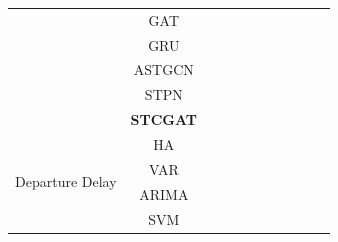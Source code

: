 \documentclass[12pt,a4paper]{report}
\begin{document}
\begin{table}[h]
\begin{tabular}{ccccccccccc}
                                          & GAT             &                              &                            & \multicolumn{1}{c|}{}               &              &               & \multicolumn{1}{c|}{}              &              &               &               \\
                                          & GRU             &                              &                            & \multicolumn{1}{c|}{}               &              &               & \multicolumn{1}{c|}{}              &              &               &               \\
                                          & ASTGCN          &                              &                            & \multicolumn{1}{c|}{}               &              &               & \multicolumn{1}{c|}{}              &              &               &               \\
                                          & STPN            &                              &                            & \multicolumn{1}{c|}{}               &              &               & \multicolumn{1}{c|}{}              &              &               &               \\
                                          & \textbf{STCGAT} &                              &                            & \multicolumn{1}{c|}{}               &              &               & \multicolumn{1}{c|}{}              &              &               &               \\ \midrule
        \multirow{11}{*}{Departure Delay} & HA              &                              &                            & \multicolumn{1}{c|}{}               &              &               & \multicolumn{1}{c|}{}              &              &               &               \\
                                          & VAR             &                              &                            & \multicolumn{1}{c|}{}               &              &               & \multicolumn{1}{c|}{}              &              &               &               \\
                                          & ARIMA           &                              &                            & \multicolumn{1}{c|}{}               &              &               & \multicolumn{1}{c|}{}              &              &               &               \\
                                          & SVM             &                              &                            & \multicolumn{1}{c|}{}               &              &               & \multicolumn{1}{c|}{}              &              &               &               \\

\end{tabular}
\end{table}
\end{document}
